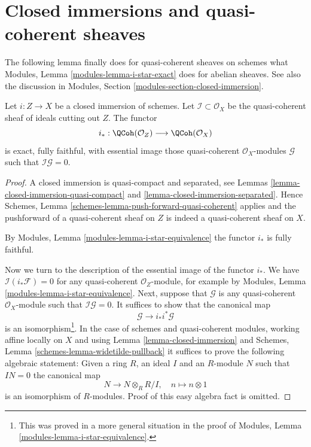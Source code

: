 \section{Closed immersions and quasi-coherent sheaves}
\label{section-closed-immersions-quasi-coherent}

\noindent
The following lemma finally does for quasi-coherent sheaves on schemes
what Modules, Lemma \ref{modules-lemma-i-star-exact} does for abelian sheaves.
See also the discussion in
Modules, Section \ref{modules-section-closed-immersion}.

\begin{lemma}
\label{lemma-i-star-equivalence}
Let $i : Z \to X$ be a closed immersion of schemes. Let
$\mathcal{I} \subset \mathcal{O}_X$ be the quasi-coherent sheaf of ideals
cutting out $Z$. The functor
$$
i_* :
\QCoh(\mathcal{O}_Z)
\longrightarrow
\QCoh(\mathcal{O}_X)
$$
is exact, fully faithful, with essential image those quasi-coherent
$\mathcal{O}_X$-modules $\mathcal{G}$ such that $\mathcal{I}\mathcal{G} = 0$.
\end{lemma}

\begin{proof}
A closed immersion is quasi-compact and separated, see
Lemmas \ref{lemma-closed-immersion-quasi-compact} and
\ref{lemma-closed-immersion-separated}. Hence
Schemes, Lemma \ref{schemes-lemma-push-forward-quasi-coherent}
applies and the pushforward of a quasi-coherent
sheaf on $Z$ is indeed a quasi-coherent sheaf on $X$.

\medskip\noindent
By Modules, Lemma \ref{modules-lemma-i-star-equivalence}
the functor $i_*$ is fully faithful.

\medskip\noindent
Now we turn to the description of the essential image of the
functor $i_*$. We have $\mathcal{I}(i_*\mathcal{F}) = 0$
for any quasi-coherent $\mathcal{O}_Z$-module, for example by
Modules, Lemma \ref{modules-lemma-i-star-equivalence}.
Next, suppose that $\mathcal{G}$
is any quasi-coherent $\mathcal{O}_X$-module such that
$\mathcal{I}\mathcal{G} = 0$. It suffices to show that the canonical map
$$
\mathcal{G} \longrightarrow i_* i^*\mathcal{G}
$$
is an isomorphism\footnote{This was proved in a more general situation
in the proof of  Modules, Lemma \ref{modules-lemma-i-star-equivalence}.}.
In the case of schemes and quasi-coherent modules, working affine locally
on $X$ and using Lemma \ref{lemma-closed-immersion} and
Schemes, Lemma \ref{schemes-lemma-widetilde-pullback}
it suffices to prove the following algebraic statement: Given a ring
$R$, an ideal $I$ and an $R$-module $N$ such that $IN = 0$ the canonical map
$$
N \longrightarrow N \otimes_R R/I,\quad
n \longmapsto n \otimes 1
$$
is an isomorphism of $R$-modules. Proof of this easy algebra fact is omitted.
\end{proof}

